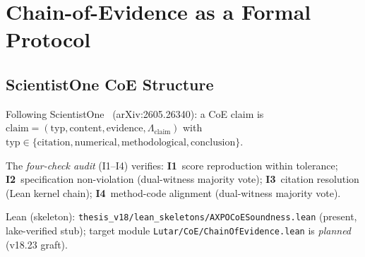 \section{Chain-of-Evidence as a Formal Protocol}
\label{sec:coe}

\subsection{ScientistOne CoE Structure}
\label{subsec:coe-framework}

\begin{definition}
\label{def:coe-claim}
Following ScientistOne~\cite{Meng2026} (arXiv:2605.26340):
a CoE claim is
$\mathrm{claim} = (\mathrm{typ}, \mathrm{content}, \mathrm{evidence}, \Lambda_{\mathrm{claim}})$
with $\mathrm{typ} \in \{\mathrm{citation}, \mathrm{numerical},
\mathrm{methodological}, \mathrm{conclusion}\}$.

The \emph{four-check audit} (I1--I4) verifies:
\textbf{I1}~score reproduction within tolerance;
\textbf{I2}~specification non-violation (dual-witness majority vote);
\textbf{I3}~citation resolution (Lean kernel chain);
\textbf{I4}~method-code alignment (dual-witness majority vote).

\textup{Lean (skeleton):} \texttt{thesis\_v18/lean\_skeletons/AXPOCoESoundness.lean}
(present, lake-verified stub);
target module \texttt{Lutar/CoE/ChainOfEvidence.lean} is \emph{planned} (v18.23 graft).
\end{definition}

